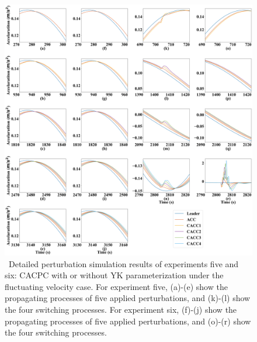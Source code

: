 \documentclass[trsc,nonblindrev]{informs3} %
\begin{document}
\begin{figure}
    \centering
    \includegraphics[width=14cm]{figs/fluat_detail.png}
    \caption{~Detailed perturbation simulation results of experiments five and six: CACPC with or without YK parameterization under the fluctuating velocity case. For experiment five, (a)-(e) show the propagating processes of five applied perturbations, and (k)-(l) show the four switching processes. For experiment six, (f)-(j) show the propagating processes of five applied perturbations, and (o)-(r) show the four switching processes.}
    \label{new6}
\end{figure}



\end{document}
